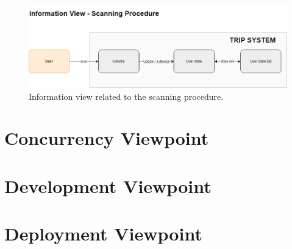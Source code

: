 \begin{figure}[H]
    \centering
    \includegraphics[width=\textwidth]{drawings/views_draft3/information_view scanning.png}
    \caption{Information view related to the scanning procedure.}
    \label{fig:information_view_scanning}
\end{figure}

\section*{Concurrency Viewpoint}

\section*{Development Viewpoint}

\section*{Deployment Viewpoint}